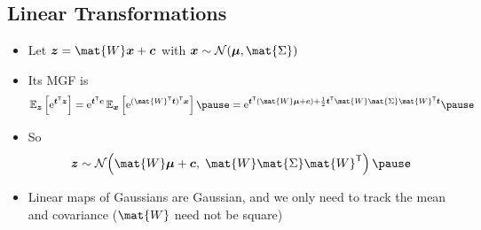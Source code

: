 
\begin{slide}
\section[-2]{Linear Transformations}

\begin{PauseHighLight}
  \begin{itemize}
  \item Let $\bm{z} = \mat{W}\bm{x} + \bm{c}$ with
    $\bm{x}\sim\mathcal{N}(\bm{\mu},\mat{\Sigma})$\pause
  \item Its MGF is
    \begin{align*}
      \av[\bm{z}]{\e{\bm{t}^\tr\bm{z}}} = \e{\bm{t}^\tr\bm{c}}\,
      \av[\bm{x}]{\e{(\mat{W}^\tr\bm{t})^\tr\bm{x}}}\pause
      = \e{\bm{t}^\tr(\mat{W}\bm{\mu}+\bm{c}) +
      \frac12\bm{t}^\tr\mat{W}\mat{\Sigma}\mat{W}^\tr\bm{t}}\pause
    \end{align*}
  \item So
    \begin{align*}
      \bm{z}\sim\mathcal{N}\!\left(\mat{W}\bm{\mu}+\bm{c},\;
      \mat{W}\mat{\Sigma}\mat{W}^\tr\right)\pause
    \end{align*}
  \item Linear maps of Gaussians are Gaussian, and we only need to
    track the mean and covariance\pause{} ($\mat{W}$ need not be
    square)\pause
  \end{itemize}
\end{PauseHighLight}

\end{slide}

\Outline %

